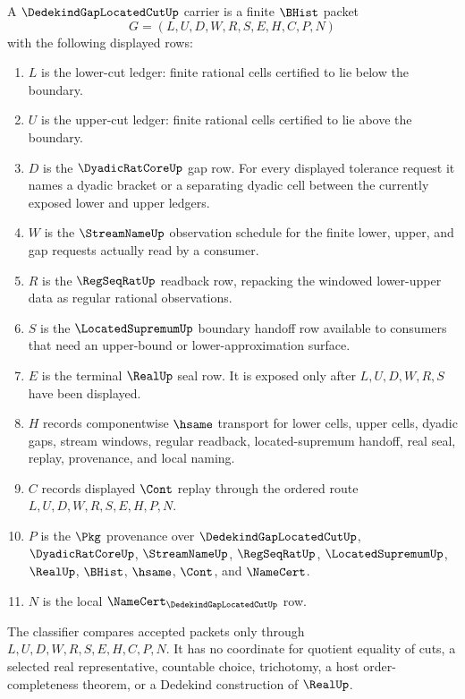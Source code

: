 \begin{definition}
\label{def:dedekind-gap-located-cut-carrier}
A $\DedekindGapLocatedCutUp$ carrier is a finite $\BHist$ packet
$$
G=(L,U,D,W,R,S,E,H,C,P,N)
$$
with the following displayed rows:
\begin{enumerate}
\item $L$ is the lower-cut ledger: finite rational cells certified to lie below the boundary.
\item $U$ is the upper-cut ledger: finite rational cells certified to lie above the boundary.
\item $D$ is the $\DyadicRatCoreUp$ gap row. For every displayed tolerance request it names a dyadic bracket or a separating dyadic cell between the currently exposed lower and upper ledgers.
\item $W$ is the $\StreamNameUp$ observation schedule for the finite lower, upper, and gap requests actually read by a consumer.
\item $R$ is the $\RegSeqRatUp$ readback row, repacking the windowed lower-upper data as regular rational observations.
\item $S$ is the $\LocatedSupremumUp$ boundary handoff row available to consumers that need an upper-bound or lower-approximation surface.
\item $E$ is the terminal $\RealUp$ seal row. It is exposed only after $L,U,D,W,R,S$ have been displayed.
\item $H$ records componentwise $\hsame$ transport for lower cells, upper cells, dyadic gaps, stream windows, regular readback, located-supremum handoff, real seal, replay, provenance, and local naming.
\item $C$ records displayed $\Cont$ replay through the ordered route $L,U,D,W,R,S,E,H,P,N$.
\item $P$ is the $\Pkg$ provenance over $\DedekindGapLocatedCutUp$, $\DyadicRatCoreUp$, $\StreamNameUp$, $\RegSeqRatUp$, $\LocatedSupremumUp$, $\RealUp$, $\BHist$, $\hsame$, $\Cont$, and $\NameCert$.
\item $N$ is the local $\NameCert_{\DedekindGapLocatedCutUp}$ row.
\end{enumerate}
The classifier compares accepted packets only through $L,U,D,W,R,S,E,H,C,P,N$. It has no coordinate for quotient equality of cuts, a selected real representative, countable choice, trichotomy, a host order-completeness theorem, or a Dedekind construction of $\RealUp$.
\end{definition}

